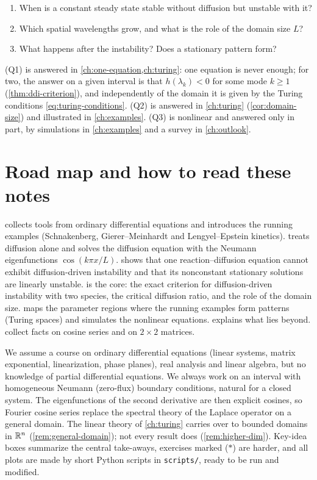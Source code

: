 \begin{keyidea}
\begin{enumerate}[label=(Q\arabic*), leftmargin=3.2em]
  \item When is a constant steady state stable without diffusion but unstable with it?
  \item Which spatial wavelengths grow, and what is the role of the domain size $L$?
  \item What happens after the instability? Does a stationary pattern form?
\end{enumerate}
\end{keyidea}

(Q1) is answered in \cref{ch:one-equation,ch:turing}: one equation is never
enough; for two, the answer on a given interval is that $h(\lambda_k)<0$ for some
mode $k\ge1$ (\cref{thm:ddi-criterion}), and independently of the domain it is
given by the Turing conditions \eqref{eq:turing-conditions}.
(Q2) is answered in \cref{ch:turing} (\cref{cor:domain-size}) and illustrated in
\cref{ch:examples}. (Q3) is nonlinear and answered only in part, by simulations in
\cref{ch:examples} and a survey in \cref{ch:outlook}.

\section{Road map and how to read these notes}\label{sec:roadmap}

 collects tools from ordinary differential equations and
introduces the running examples (Schnakenberg, Gierer--Meinhardt and
Lengyel--Epstein kinetics).  treats diffusion alone and solves
the diffusion equation with the Neumann eigenfunctions $\cos(k\pi x/L)$.
 shows that one reaction--diffusion equation cannot exhibit
diffusion-driven instability and that its nonconstant stationary solutions are
linearly unstable.  is the core: the exact criterion for diffusion-driven
instability with two species, the critical diffusion ratio, and the role of the
domain size.  maps the parameter regions where the running
examples form patterns (Turing spaces) and simulates the nonlinear equations.
 explains what lies beyond. 
collect facts on cosine series and on $2\times2$ matrices.

We assume a course on ordinary differential equations (linear systems, matrix
exponential, linearization, phase planes), real analysis and linear algebra, but no
knowledge of partial differential equations. We always work on an interval with
homogeneous Neumann (zero-flux) boundary conditions, natural for a closed system.
The eigenfunctions of the second derivative are then explicit cosines, so Fourier
cosine series replace the spectral theory of the Laplace operator on a general
domain. The linear theory of \cref{ch:turing} carries over to bounded domains
in $\mathbb{R}^n$ (\cref{rem:general-domain}); not every result does
(\cref{rem:higher-dim}). Key-idea boxes summarize the central take-aways,
exercises marked ($\ast$) are harder, and all plots are made by short Python
scripts in \texttt{scripts/}, ready to be run and modified.

